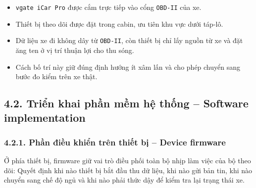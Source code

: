 \documentclass[a4paper]{extarticle}
\providecommand{\tightlist}{%
  \setlength{\itemsep}{0pt}\setlength{\parskip}{0pt}}
\begin{document}
\begin{itemize}
\tightlist
\item
  \texttt{vgate\ iCar\ Pro} được cắm trực tiếp vào cổng \texttt{OBD-II} của xe.
\item
  Thiết bị theo dõi được đặt trong cabin, ưu tiên khu vực dưới táp-lô.
\item
  Dữ liệu xe đi không dây từ \texttt{OBD-II}, còn thiết bị chỉ lấy nguồn từ xe và đặt ăng ten ở vị trí thuận lợi cho thu sóng.
\item
  Cách bố trí này giữ đúng định hướng ít xâm lấn và cho phép chuyển sang bước đo kiểm trên xe thật.
\end{itemize}

\subsection{4.2. Triển khai phần mềm hệ thống -- Software implementation}\label{triux1ec3n-khai-phux1ea7n-mux1ec1m-hux1ec7-thux1ed1ng-software-implementation}

\subsubsection{4.2.1. Phần điều khiển trên thiết bị -- Device firmware}\label{phux1ea7n-ux111iux1ec1u-khiux1ec3n-truxean-thiux1ebft-bux1ecb-device-firmware}

Ở phía thiết bị, firmware giữ vai trò điều phối toàn bộ nhịp làm việc của bộ theo dõi: Quyết định khi nào thiết bị bắt đầu thu dữ liệu, khi nào gửi bản tin, khi nào chuyển sang chế độ ngủ và khi nào phải thức dậy để kiểm tra lại trạng thái xe.
\end{document}
